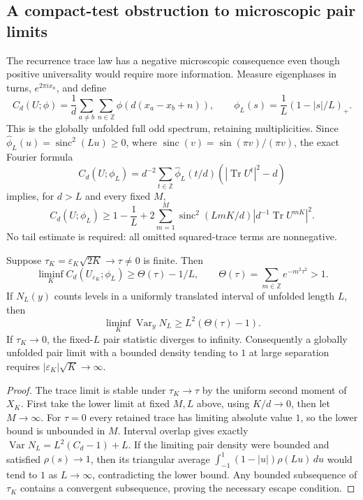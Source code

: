 \subsection{A compact-test obstruction to microscopic pair limits}
The recurrence trace law has a negative microscopic consequence even though
positive universality would require more information. Measure eigenphases
in turns, $e^{2\pi i x_a}$, and define
\[
 C_d(U;\phi)=\frac1d\sum_{a\ne b}\sum_{n\in\mathbb Z}
                  \phi(d(x_a-x_b+n)),\qquad
 \phi_L(s)=\frac1L(1-|s|/L)_+.
\]
This is the globally unfolded full odd spectrum, retaining multiplicities.
Since $\widehat\phi_L(u)=\operatorname{sinc}^2(Lu)\geq0$, where
$\operatorname{sinc}(v)=\sin(\pi v)/(\pi v)$, the exact Fourier formula
\[
 C_d(U;\phi_L)=d^{-2}\sum_{t\in\mathbb Z}
       \widehat\phi_L(t/d)(|\operatorname{Tr}U^t|^2-d)
\]
implies, for $d>L$ and every fixed $M$,
\[
 C_d(U;\phi_L)\geq 1-\frac1L+
 2\sum_{m=1}^M\operatorname{sinc}^2(LmK/d)
                 |d^{-1}\operatorname{Tr}U^{mK}|^2.
\]
No tail estimate is required: all omitted squared-trace terms are nonnegative.

\begin{theorem}
Suppose $\tau_K=\varepsilon_K\sqrt{2K}\to\tau\ne0$ is finite. Then
\[
 \liminf_K C_d(U_{\varepsilon_K};\phi_L)
    \geq\Theta(\tau)-1/L,\qquad
 \Theta(\tau)=\sum_{m\in\mathbb Z}e^{-m^2\tau^2}>1.
\]
If $N_L(y)$ counts levels in a uniformly translated interval of unfolded
length $L$, then
\[
 \liminf_K\operatorname{Var}_y N_L\geq L^2(\Theta(\tau)-1).
\]
If $\tau_K\to0$, the fixed-$L$ pair statistic diverges to infinity.
Consequently a globally unfolded pair limit with a bounded density tending
to $1$ at large separation requires $|\varepsilon_K|\sqrt K\to\infty$.
\end{theorem}

\begin{proof}
The trace limit is stable under $\tau_K\to\tau$ by the uniform second
moment of $X_K$. First take the lower limit at fixed $M,L$ above, using
$K/d\to0$, then let $M\to\infty$. For $\tau=0$ every retained trace has
limiting absolute value $1$, so the lower bound is unbounded in $M$.
Interval overlap gives exactly
$\operatorname{Var}N_L=L^2(C_d-1)+L$.
If the limiting pair density were bounded and satisfied $\rho(s)\to1$,
then its triangular average
$\int_{-1}^1(1-|u|)\rho(Lu)\,du$ would tend to $1$ as $L\to\infty$,
contradicting the lower bound. Any bounded subsequence of $\tau_K$ contains
a convergent subsequence, proving the necessary escape condition.
\end{proof}

